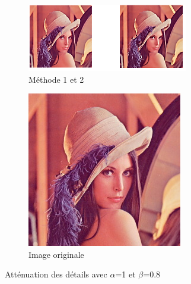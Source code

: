 \documentclass[twoside,UTF8]{EPURapport}
\begin{document}
\begin{figure}
        \centering
        \begin{subfigure}[b]{0.3\textwidth}
                \includegraphics[]{images/lena1_08.png} 
                \caption{Méthode 1 et 2}
        \end{subfigure}
        
        \begin{subfigure}[b]{0.3\textwidth}
                \includegraphics[scale=0.5]{images/lena.jpg}
             	\caption{Image originale}
        \end{subfigure}
        \caption{Atténuation des détails avec $\alpha$=1 et $\beta$=0.8}
\end{figure}
\end{document}
